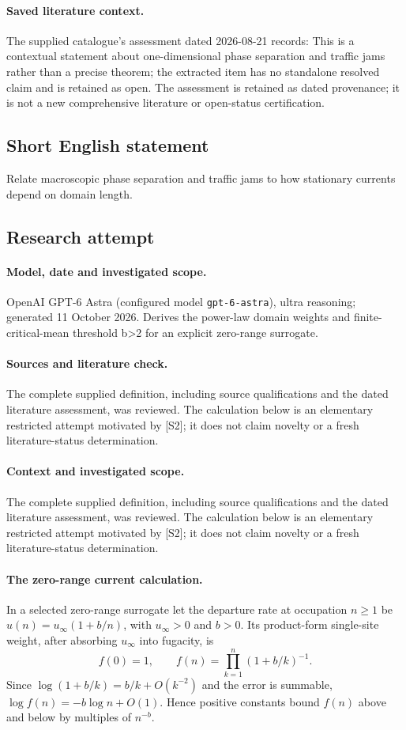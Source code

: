 \documentclass[11pt]{article}
\begin{document}
\paragraph{Saved literature context.} The supplied catalogue's assessment dated 2026-08-21 records: This is a contextual statement about one-dimensional phase separation and traffic jams rather than a precise theorem; the extracted item has no standalone resolved claim and is retained as open. The assessment is retained as dated provenance; it is not a new comprehensive literature or open-status certification.
\subsection{Short English statement}
Relate macroscopic phase separation and traffic jams to how stationary currents depend on domain length.
\subsection{Research attempt}
\paragraph{Model, date and investigated scope.}
OpenAI GPT-6 Astra (configured model \texttt{gpt-6-astra}), ultra reasoning; generated 11 October 2026. Derives the power-law domain weights and finite-critical-mean threshold b>2 for an explicit zero-range surrogate.

\paragraph{Sources and literature check.}
The complete supplied definition, including source qualifications and the dated literature assessment, was reviewed. The calculation below is an elementary restricted attempt motivated by [S2]; it does not claim novelty or a fresh literature-status determination.

\paragraph{Context and investigated scope.} The complete supplied definition, including source qualifications and the dated literature assessment, was reviewed. The calculation below is an elementary restricted attempt motivated by [S2]; it does not claim novelty or a fresh literature-status determination.

\paragraph{The zero-range current calculation.} In a selected zero-range surrogate let the departure rate at occupation $n\geq1$ be $u(n)=u_\infty(1+b/n)$, with $u_\infty>0$ and $b>0$. Its product-form single-site weight, after absorbing $u_\infty$ into fugacity, is
\[
 f(0)=1,\qquad f(n)=\prod_{k=1}^n(1+b/k)^{-1}.
\]
Since $\log(1+b/k)=b/k+O(k^{-2})$ and the error is summable, $\log f(n)=-b\log n+O(1)$. Hence positive constants bound $f(n)$ above and below by multiples of $n^{-b}$.
\end{document}
